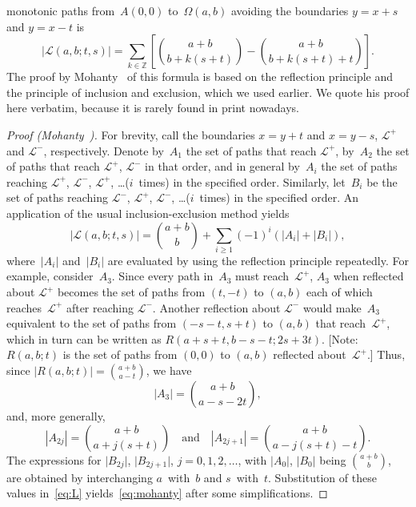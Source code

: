 \documentclass[11pt]{article}
\begin{document}
monotonic paths from~\(A(0,0)\) to~\(\Omega(a,b)\) avoiding the
boundaries \(y = x + s\) and \(y = x - t\) is
\begin{equation}
\left\lvert\mathcal{L}(a,b;t,s)\right\rvert = \sum_{k \in \mathbb{Z}}\left[\binom{a+b}{b+k(s+t)} - \binom{a+b}{b+k(s+t)+t}\right].
\label{eq:mohanty}
\end{equation}
The proof by Mohanty~\cite[p.~6]{Mohanty:1979} of this formula is
based on the reflection principle and the principle of inclusion and
exclusion, which we used earlier. We quote his proof here verbatim,
because it is rarely found in print nowadays.
\begin{proof}[Proof {\rm (Mohanty~\cite{Mohanty:1979})}]
 For brevity, call the boundaries \(x=y+t\) and
  \(x=y-s\), \(\mathcal{L}^{+}\) and \(\mathcal{L}^{-}\),
  respectively. Denote by~\(A_1\) the set of paths that reach
  \(\mathcal{L}^{+}\), by~\(A_2\) the set of paths that reach
  \(\mathcal{L}^{+}\), \(\mathcal{L}^{-}\) in that order, and in
  general by~\(A_i\) the set of paths reaching \(\mathcal{L}^{+}\),
  \(\mathcal{L}^{-}\), \(\mathcal{L}^{+}\), \ldots\@ (\(i\)~times) in
  the specified order. Similarly, let~\(B_i\) be the set of paths
  reaching \(\mathcal{L}^{-}\), \(\mathcal{L}^{+}\),
  \(\mathcal{L}^{-}\), \ldots\@ (\(i\)~times) in the specified order. An
  application of the usual inclusion-exclusion method yields
\begin{equation}
\left\lvert\mathcal{L}(a,b;t,s)\right\rvert = \binom{a+b}{b} + \sum_{i
\geqslant 1}(-1)^{i}\left(\lvert{A_i}\rvert + \lvert{B_i}\rvert\right),
\label{eq:L}
\end{equation}
where~\(\lvert{A_i}\rvert\) and~\(\lvert{B_i}\rvert\) are evaluated by
using the reflection principle repeatedly. For example,
consider~\(A_3\). Since every path in~\(A_3\) must
reach~\(\mathcal{L}^{+}\), \(A_3\) when reflected about
\(\mathcal{L}^{+}\) becomes the set of paths from \((t,-t)\) to
\((a,b)\) each of which reaches~\(\mathcal{L}^{+}\) after reaching
\(\mathcal{L}^{-}\). Another reflection about \(\mathcal{L}^{-}\)
would make~\(A_3\) equivalent to the set of paths from \((-s-t,s+t)\)
to \((a,b)\) that reach~\(\mathcal{L}^{+}\), which in turn can be
written as \(R(a+s+t,b-s-t; 2s+3t)\). [Note: \(R(a,b;t)\) is the set
  of paths from \((0,0)\) to \((a,b)\) reflected
  about~\(\mathcal{L}^{+}\).] Thus, since \(\lvert{R(a,b;t)}\rvert =
\binom{a+b}{a-t}\), we have
\begin{equation*}
\left\lvert{A_3}\right\rvert = \binom{a+b}{a-s-2t},
\end{equation*}
and, more generally,
\begin{equation*}
\left\lvert{A_{2j}}\right\rvert = \binom{a+b}{a+j(s+t)}
\quad\text{and}\quad
\left\lvert{A_{2j+1}}\right\rvert = \binom{a+b}{a-j(s+t)-t}.
\end{equation*}
The expressions for \(\lvert{B_{2j}}\rvert\),
\(\lvert{B_{2j+1}}\rvert\), \(j=0, 1, 2, \dots\), with
\(\lvert{A_0}\rvert\), \(\lvert{B_0}\rvert\) being \(\binom{a+b}{b}\),
are obtained by interchanging \(a\)~with~\(b\) and
\(s\)~with~\(t\). Substitution of these values in~\eqref{eq:L}
yields~\eqref{eq:mohanty} after some simplifications.
\end{proof}
\end{document}
